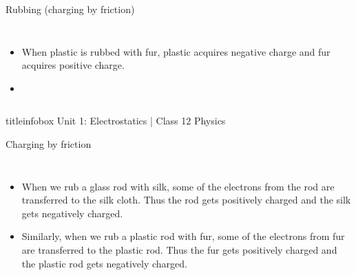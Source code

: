 \begin{frame}
\begin{frame}{Rubbing (charging by friction)}
\begin{columns}
\begin{itemize}
            \vspace{0.5cm}
            
            \item When plastic is rubbed with fur, plastic acquires negative charge and fur acquires positive charge.
            
            \vspace{0.5cm}
            
            \item {}
        \end{itemize}
    \end{columns}
    
    \vfill
    
    \begin{beamercolorbox}[wd=\textwidth,ht=0.5cm,dp=0.1cm,center]{titleinfobox}
        \small\color{coolgray} Unit 1: Electrostatics | Class 12 Physics
    \end{beamercolorbox}
\end{frame}

\begin{frame}{Charging by friction}
    \begin{columns}
        \begin{itemize}
        \item When we rub a glass rod with silk, some of the electrons from the rod are transferred to the silk cloth. Thus the rod gets positively charged and the silk gets negatively charged.
            
            \vspace{0.5cm}
            
            \item Similarly, when we rub a plastic rod with fur, some of the electrons from fur are transferred to the plastic rod. Thus the fur gets positively charged and the plastic rod gets negatively charged.
        \end{itemize}
    \end{columns}
    
    \vfill
    

\end{frame}
\end{frame}
